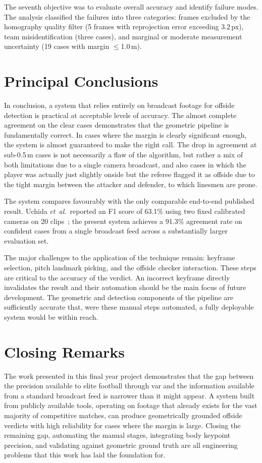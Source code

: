 The seventh objective was to evaluate overall accuracy and identify failure modes. The analysis classified the failures into three categories: frames excluded by the homography quality filter (5 frames with reprojection error exceeding 3.2\,px), team misidentification (three cases), and marginal or moderate measurement uncertainty (19 cases with margin $\leq$1.0\,m).

\section{Principal Conclusions}%
\label{sec:conc_principal}

In conclusion, a system that relies entirely on broadcast footage for offside detection is practical at acceptable levels of accuracy. The almost complete agreement on the clear cases demonstrates that the geometric pipeline is fundamentally correct. In cases where the margin is clearly significant enough, the system is almost guaranteed to make the right call. The drop in agreement at sub-0.5\,m cases is not necessarily a flaw of the algorithm, but rather a mix of both limitations due to a single camera broadcast, and also cases in which the player was actually just slightly onside but the referee flagged it as offside due to the tight margin between the attacker and defender, to which linesmen are prone. 

The system compares favourably with the only comparable end-to-end published result. Uchida \textit{et~al.}\ reported an F1 score of 63.1\% using two fixed calibrated cameras on 20 clips~\cite{uchida2021offside}; the present system achieves a 91.3\% agreement rate on confident cases from a single broadcast feed across a substantially larger evaluation set.

The major challenges to the application of the technique remain: keyframe selection, pitch landmark picking, and the offside checker interaction. These steps are critical to the accuracy of the verdict. An incorrect keyframe directly invalidates the result and their automation should be the main focus of future development. The geometric and detection components of the pipeline are sufficiently accurate that, were these manual steps automated, a fully deployable system would be within reach.

\section{Closing Remarks}%
\label{sec:conc_closing}

The work presented in this final year project demonstrates that the gap between the precision available to elite football through \gls{var} and the information available from a standard broadcast feed is narrower than it might appear. A system built from publicly available tools, operating on footage that already exists for the vast majority of competitive matches, can produce geometrically grounded offside verdicts with high reliability for cases where the margin is large. Closing the remaining gap, automating the manual stages, integrating body keypoint precision, and validating against geometric ground truth are all engineering problems that this work has laid the foundation for.

